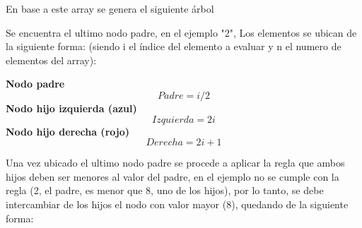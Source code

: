 \documentclass{article}
\begin{document}
\begin{enumerate}
            En base a este array se genera el siguiente árbol


        Se encuentra el ultimo nodo padre, en el ejemplo "2", Los elementos se ubican de la siguiente forma: (siendo i el índice del elemento a evaluar y n el numero de elementos del array):\par
        
        \textbf{Nodo padre}
        \[ Padre = i/2 \]
        \textbf{Nodo hijo izquierda (azul)}
        \[ Izquierda = 2i \]
        \textbf{Nodo hijo derecha (rojo)}
        \[ Derecha = 2i+1 \]

        
        Una vez ubicado el ultimo nodo padre se procede a aplicar la regla que ambos hijos deben ser menores al valor del padre, en el ejemplo no se cumple con la regla (2, el padre, es menor que 8, uno de los hijos), por lo tanto, se debe intercambiar de los hijos el nodo con valor mayor (8), quedando de la siguiente forma:


\end{enumerate}
\end{document}
